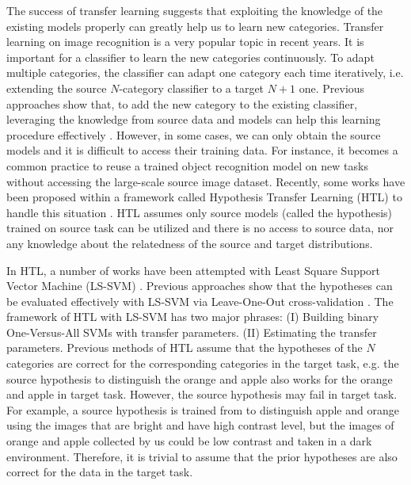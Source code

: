 The success of transfer learning suggests that exploiting the knowledge of the existing models properly can greatly help us to learn new categories. 
Transfer learning on image recognition is a very popular topic in recent years. It is important for a classifier to learn the new categories continuously. To adapt multiple categories, the classifier can adapt one category each time iteratively, i.e.  extending the source $N$-category classifier to a target $N+1$ one.
Previous approaches show that, to add the new category to the existing classifier, leveraging the knowledge from source data and models can help this learning procedure effectively \cite{tommasi2014learning} \cite{kuzborskij2013n}. 
However, in some cases, we can only obtain the source models and it is difficult to access their training data.   
For instance, it becomes a common practice to reuse a trained object recognition model on new tasks without accessing the large-scale source image dataset.
Recently, some works have been proposed within a framework called Hypothesis Transfer Learning (HTL) to handle this situation \cite{kuzborskij2013stability}. HTL assumes only source models (called the hypothesis) trained on source task can be utilized and there is no access to source data, nor any knowledge about the relatedness of the source and target distributions. 

In HTL, a number of works have been attempted with Least Square Support Vector Machine (LS-SVM) \cite{kuzborskij2013stability}. Previous approaches show that the hypotheses can be evaluated effectively with LS-SVM via Leave-One-Out cross-validation \cite{tommasi2014learning}. The framework of HTL with LS-SVM has two major phrases: (I) Building binary One-Versus-All SVMs with transfer parameters. (II) Estimating the transfer parameters.
Previous methods of HTL assume that the hypotheses of the $N$ categories are correct for the corresponding categories in the target task, e.g. the source hypothesis to distinguish the orange and apple also works for the orange and apple in target task\cite{kuzborskij2013n}. However, the source hypothesis may fail in target task. For example, a source hypothesis is trained from to distinguish apple and orange using the images that are bright and have high contrast level, but the images of orange and apple collected by us could be low contrast and taken in a dark environment. Therefore, it is trivial to assume that the prior hypotheses are also correct for the data in the target task. 

